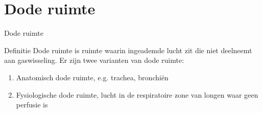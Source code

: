 \documentclass[]{beamer}
\begin{document}
\section{Dode ruimte}
\begin{frame}{Dode ruimte}
    \begin{block}{Definitie}
        Dode ruimte is ruimte waarin ingeademde lucht zit die niet deelneemt aan gaswisseling. Er zijn twee varianten van dode ruimte:
        \begin{enumerate}
            \item Anatomisch dode ruimte, e.g. trachea, bronchiën
            \item Fysiologische dode ruimte, lucht in de respiratoire zone van longen waar geen perfusie is
        \end{enumerate}
    \end{block}
\end{frame}
{\aauwavesbg
\begin{frame}
\end{frame}}
\end{document}
